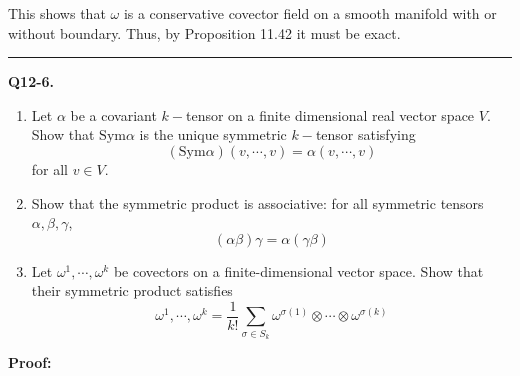 \documentclass{article}
\begin{document}
\vskip 0.5cm
This shows that $\omega$ is a conservative covector field on a smooth manifold with or without boundary. Thus, by Proposition 11.42 it must be exact. 




\vskip 0.5cm
\hrule 
\vskip 0.5cm




\textbf{Q12-6.} \begin{enumerate}[label=(\alph*)]
  \item Let $\alpha$ be a covariant $k-$tensor on a finite dimensional real vector space $V$. Show that $\mathrm{Sym}\alpha$ is the unique symmetric $k-$tensor satisfying 
  \[  \left(\mathrm{Sym}\alpha\right)\left(v, \cdots, v\right) = \alpha\left(v, \cdots, v\right) \] for all $v \in V$.

  \item Show that the symmetric product is associative: for all symmetric tensors $\alpha, \beta, \gamma$,
  \[ \left(\alpha \beta\right) \gamma = \alpha \left(\gamma \beta\right)  \]

  \item Let $\omega^1, \cdots, \omega^k$ be covectors on a finite-dimensional vector space. Show that their symmetric product satisfies 
  \[  \omega^1, \cdots, \omega^k = \frac{1}{k!}\sum_{\sigma \in S_k} \omega^{\sigma(1)} \otimes \cdots \otimes \omega^{\sigma(k)} \]
\end{enumerate} 

\vskip 0.5cm
\textbf{Proof:}
\end{document}

